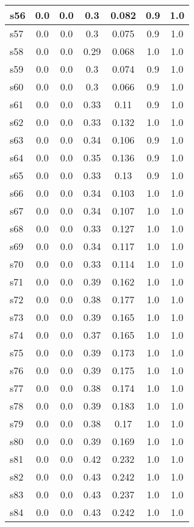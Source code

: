 \documentclass{article}
\begin{document}
\begin{tabular}{|l|c|c|c|c|c|c|}
\hline
s56 &0.0 & 0.0 & 0.3 & 0.082 & 0.9 & 1.0\\
\hline
s57 &0.0 & 0.0 & 0.3 & 0.075 & 0.9 & 1.0\\
\hline
s58 &0.0 & 0.0 & 0.29 & 0.068 & 1.0 & 1.0\\
\hline
s59 &0.0 & 0.0 & 0.3 & 0.074 & 0.9 & 1.0\\
\hline
s60 &0.0 & 0.0 & 0.3 & 0.066 & 0.9 & 1.0\\
\hline
s61 &0.0 & 0.0 & 0.33 & 0.11 & 0.9 & 1.0\\
\hline
s62 &0.0 & 0.0 & 0.33 & 0.132 & 1.0 & 1.0\\
\hline
s63 &0.0 & 0.0 & 0.34 & 0.106 & 0.9 & 1.0\\
\hline
s64 &0.0 & 0.0 & 0.35 & 0.136 & 0.9 & 1.0\\
\hline
s65 &0.0 & 0.0 & 0.33 & 0.13 & 0.9 & 1.0\\
\hline
s66 &0.0 & 0.0 & 0.34 & 0.103 & 1.0 & 1.0\\
\hline
s67 &0.0 & 0.0 & 0.34 & 0.107 & 1.0 & 1.0\\
\hline
s68 &0.0 & 0.0 & 0.33 & 0.127 & 1.0 & 1.0\\
\hline
s69 &0.0 & 0.0 & 0.34 & 0.117 & 1.0 & 1.0\\
\hline
s70 &0.0 & 0.0 & 0.33 & 0.114 & 1.0 & 1.0\\
\hline
s71 &0.0 & 0.0 & 0.39 & 0.162 & 1.0 & 1.0\\
\hline
s72 &0.0 & 0.0 & 0.38 & 0.177 & 1.0 & 1.0\\
\hline
s73 &0.0 & 0.0 & 0.39 & 0.165 & 1.0 & 1.0\\
\hline
s74 &0.0 & 0.0 & 0.37 & 0.165 & 1.0 & 1.0\\
\hline
s75 &0.0 & 0.0 & 0.39 & 0.173 & 1.0 & 1.0\\
\hline
s76 &0.0 & 0.0 & 0.39 & 0.175 & 1.0 & 1.0\\
\hline
s77 &0.0 & 0.0 & 0.38 & 0.174 & 1.0 & 1.0\\
\hline
s78 &0.0 & 0.0 & 0.39 & 0.183 & 1.0 & 1.0\\
\hline
s79 &0.0 & 0.0 & 0.38 & 0.17 & 1.0 & 1.0\\
\hline
s80 &0.0 & 0.0 & 0.39 & 0.169 & 1.0 & 1.0\\
\hline
s81 &0.0 & 0.0 & 0.42 & 0.232 & 1.0 & 1.0\\
\hline
s82 &0.0 & 0.0 & 0.43 & 0.242 & 1.0 & 1.0\\
\hline
s83 &0.0 & 0.0 & 0.43 & 0.237 & 1.0 & 1.0\\
\hline
s84 &0.0 & 0.0 & 0.43 & 0.242 & 1.0 & 1.0\\

\end{tabular}
\end{document}
